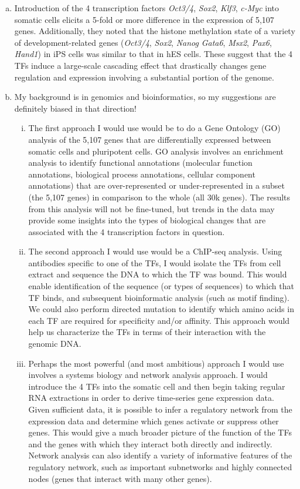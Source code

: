 \documentclass[a4paper, 10pt]{article}
\begin{document}
\begin{enumerate}[a)]
  \item Introduction of the 4 transcription factors \emph{Oct3/4}, \emph{Sox2}, \emph{Klf3}, \emph{c-Myc} into somatic cells elicits a 5-fold or more difference in the expression of 5,107 genes. Additionally, they noted that the histone methylation state of a variety of development-related genes (\emph{Oct3/4}, \emph{Sox2}, \emph{Nanog} \emph{Gata6}, \emph{Msx2}, \emph{Pax6}, \emph{Hand1}) in iPS cells was similar to that in hES cells. These suggest that the 4 TFs induce a large-scale cascading effect that drastically changes gene regulation and expression involving a substantial portion of the genome.
  \item My background is in genomics and bioinformatics, so my suggestions are definitely biased in that direction!
    \begin{enumerate}[i.]
      \item The first approach I would use would be to do a Gene Ontology (GO) analysis of the 5,107 genes that are differentially expressed between somatic cells and pluripotent cells. GO analysis involves an enrichment analysis to identify functional annotations (molecular function annotations, biological process annotations, cellular component annotations) that are over-represented or under-represented in a subset (the 5,107 genes) in comparison to the whole (all 30k genes). The results from this analysis will not be fine-tuned, but trends in the data may provide some insights into the types of biological changes that are associated with the 4 transcription factors in question.
    
    \item The second approach I would use would be a ChIP-seq analysis. Using antibodies specific to one of the TFs, I would isolate the TFs from cell extract and sequence the DNA to which the TF was bound. This would enable identification of the sequence (or types of sequences) to which that TF binds, and subsequent bioinformatic analysis (such as motif finding). We could also perform directed mutation to identify which amino acids in each TF are required for specificity and/or affinity. This approach would help us characterize the TFs in terms of their interaction with the genomic DNA.
    
    \item Perhaps the most powerful (and most ambitious) approach I would use involves a systems biology and network analysis approach. I would introduce the 4 TFs into the somatic cell and then begin taking regular RNA extractions in order to derive time-series gene expression data. Given sufficient data, it is possible to infer a regulatory network from the expression data and determine which genes activate or suppress other genes. This would give a much broader picture of the function of the TFs and the genes with which they interact both directly and indirectly. Network analysis can also identify a variety of informative features of the regulatory network, such as important subnetworks and highly connected nodes (genes that interact with many other genes).
    \end{enumerate}
\end{enumerate}
\end{document}
